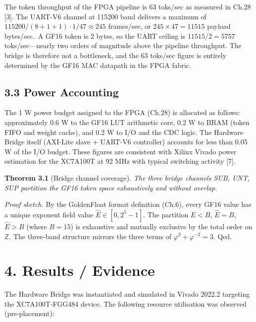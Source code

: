 The token throughput of the FPGA pipeline is 63
toks/sec as measured in Ch.28 [3]. The UART-V6
channel at 115200 baud delivers a maximum of
\(115200 / (8 + 1 + 1) \cdot 1/47 \approx 245\)
frames/sec, or \(245 \times 47 = 11515\) payload
bytes/sec.~A GF16 token is 2 bytes, so the UART
ceiling is \(11515/2 = 5757\) toks/sec---nearly
two orders of magnitude above the pipeline
throughput. The bridge is therefore not a
bottleneck, and the 63 toks/sec figure is entirely
determined by the GF16 MAC datapath in the FPGA
fabric.

\subsection{3.3 Power
Accounting}\label{fa_12:power-accounting}

The 1 W power budget assigned to the FPGA (Ch.28)
is allocated as follows: approximately 0.6 W to
the GF16 LUT arithmetic core, 0.2 W to BRAM (token
FIFO and weight cache), and 0.2 W to I/O and the
CDC logic. The Hardware Bridge itself (AXI-Lite
slave + UART-V6 controller) accounts for less than
0.05 W of the I/O budget. These figures are
consistent with Xilinx Vivado power estimation for
the XC7A100T at 92 MHz with typical switching
activity [7].

\textbf{Theorem 3.1} (Bridge channel coverage).
\emph{The three bridge channels SUB, UNT, SUP
partition the GF16 token space exhaustively and
without overlap.}

\emph{Proof sketch.} By the GoldenFloat format
definition (Ch.6), every GF16 value has a unique
exponent field value \(\hat E \in [0, 2^5-1]\).
The partition \(\hat E < B\), \(\hat E = B\),
\(\hat E > B\) (where \(B = 15\)) is exhaustive
and mutually exclusive by the total order on
\(\mathbb{Z}\). The three-band structure mirrors
the three terms of
\(\varphi^2 + \varphi^{-2} = 3\). Qed.

\section{4. Results /
Evidence}\label{fa_12:results-evidence}

The Hardware Bridge was instantiated and simulated
in Vivado 2022.2 targeting the XC7A100T-FGG484
device. The following resource utilisation was
observed (pre-placement):

